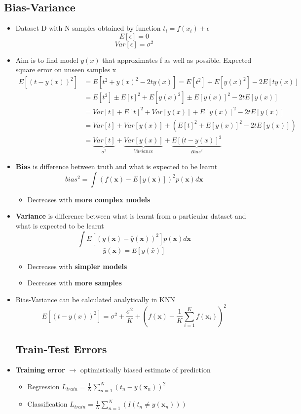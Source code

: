 \documentclass[12pt]{article} %
\begin{document}
\subsection{Bias-Variance}
\begin{itemize}
\item Dataset D with N samples obtained by function $t_i = f(x_i)+\epsilon$
$$ E[\epsilon]=0$$
$$ Var[\epsilon] = \sigma^2$$
\item Aim is to find model $y(x)$  that approximates f as well as possible. Expected square error on unseen samples x
\begin{align*}
 E[(t-y(x))^2] &= E[t^2+y(x)^2 -2ty(x)]=E[t^2]+E[y(x)^2]-2E[ty(x)]  \\
 &= E[t^2] \pm E[t]^2 + E[y(x)^2] \pm E[y(x)]^2 -2tE[y(x)] \\
 &= Var[t]+E[t]^2+Var[y(x)]+E[y(x)]^2-2tE[y(x)] \\
 &= Var[t]+Var[y(x)]+ (E[t]^2 + E[y(x)]^2 - 2tE[y(x)])\\
 &= \underbrace{Var[t]}_{\sigma^2}+\underbrace{Var[y(x)]}_{Variance}+\underbrace{E[(t-y(x)]^2}_{Bias^2}
\end{align*}

\item \textbf{Bias} is difference between truth and what is expected to be learnt 
$$ bias^2= \int (f(\bm{x})-E[y(\bm{x})])^2p(\bm{x})d\bm{x}$$
\begin{itemize}
\item Decreases with \textbf{more complex models}
\end{itemize}

\item \textbf{Variance} is difference between what is learnt from a particular dataset and what is expected to be learnt 
$$ \int E[(y(\bm{x}) - \bar{y}(\bm{x}))^2]p(\bm{x})d\bm{x}$$
$$ \bar{y}(\bm{x})=E[y(\bar{x})]$$
\begin{itemize}
\item Decreases with \textbf{simpler models}
\item Decreases with \textbf{more samples}
\end{itemize}

\item Bias-Variance can be calculated analytically in KNN
$$ E[(t-y(x))^2]=  \sigma^2 + \frac{\sigma^2}{K}+\left(  f(\bm{x}) -\frac{1}{K} \sum \limits_{i=1}^Kf(\bm{x}_i) \right)^2$$

\subsection{Train-Test Errors}
\item \textbf{Training error} $\rightarrow$ optimistically biased estimate of prediction
\begin{itemize}
\item Regression $ L_{train} = \frac{1}{N} \sum \limits_{n=1}^N (t_n - y(\bm{x}_n))^2$
\item Classification $ L_{train} = \frac{1}{N} \sum \limits_{n=1}^N (I(t_n \neq y(\bm{x}_n)))$
\end{itemize}


\end{itemize}
\end{document}
